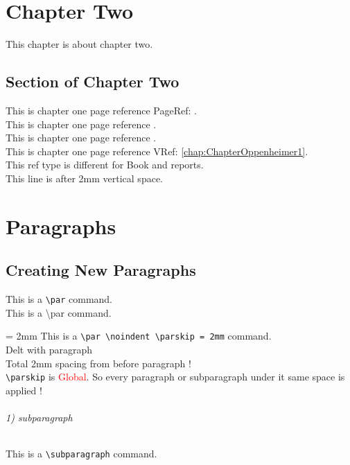 \documentclass[a4paper, 10pt]{report}
\begin{document}
\chapter[Just Chapter Two]{Chapter Two} \label{chap:Chapter2}
This chapter is about chapter two.
\section{Section of Chapter Two}
This is chapter one page reference PageRef: \pageref{chap:ChapterOppenheimer1}. \\
This is chapter one page reference . \\
This is chapter one page reference . \\
This is chapter one page reference VRef: \vref{chap:ChapterOppenheimer1}. \\
This ref type is different for Book and reports. \\[2mm]
This line is after 2mm vertical space. \\

\chapter[Paragraphs]{Paragraphs} \label{chap:Chapter3}
\section[creating new paragraphs]{Creating New Paragraphs}
\par {This is a \verb|\par| command.} \\    %
This is a \textbackslash par command. \\

\par \noindent \parskip = 2mm {This is a \verb|\par \noindent \parskip = 2mm| command. \\
		Delt with paragraph \\
		Total 2mm spacing from before paragraph ! \\
		\verb|\parskip| is \textcolor{red}{Global}. So every paragraph or subparagraph under it same space is applied !} \\
\subparagraph{1) subparagraph}  This is a \verb|\subparagraph| command. \\    %
\end{document}
